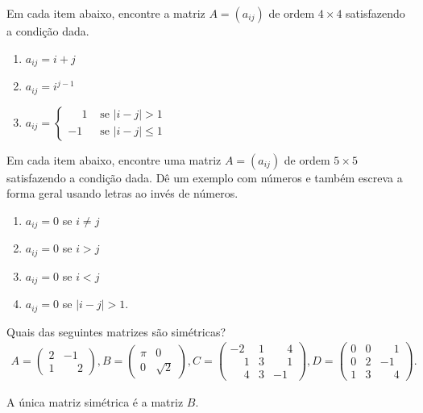 \documentclass[12pt]{exam}
\begin{document}
\begin{exercicio}
    Em cada item abaixo, encontre a matriz $A = (a_{ij})$ de ordem $4 \times 4$ satisfazendo a condição dada.
    \begin{enumerate}[label={\alph*})]
        \item $a_{ij} = i + j$
        \item $a_{ij} = i^{j - 1}$
        \item $a_{ij} = \begin{cases}\phantom{-} 1 & \mbox{ se } |i - j| > 1\\-1 & \mbox{ se } |i - j| \le 1\end{cases}$
    \end{enumerate}
\end{exercicio}

\begin{exercicio}
    Em cada item abaixo, encontre uma matriz $A = (a_{ij})$ de ordem $5 \times 5$ satisfazendo a condição dada. Dê um exemplo com números e também escreva a forma geral usando letras ao invés de números.
    \begin{enumerate}[label={\alph*})]
        \item $a_{ij} = 0$ se $i \ne j$
        \item $a_{ij} = 0$ se $i > j$
        \item $a_{ij} = 0$ se $i < j$
        \item $a_{ij} = 0$ se $|i - j| > 1$.
    \end{enumerate}
\end{exercicio}

\begin{exercicio}
    Quais das seguintes matrizes são simétricas?
    \begin{align*}
        A = \begin{pmatrix}2 & -1\\1 & \phantom{-} 2\end{pmatrix},
        B = \begin{pmatrix}\pi & 0\\0 & \sqrt{2}\end{pmatrix},
        C = \begin{pmatrix}-2 & 1 & \phantom{-} 4\\\phantom{-} 1 & 3 & \phantom{-} 1\\\phantom{-} 4 & 3 & -1\end{pmatrix},
        D = \begin{pmatrix}0 & 0 & \phantom{-} 1\\0 & 2 & -1\\1 & 3 & \phantom{-} 4\end{pmatrix}.
    \end{align*}
    \begin{solucao}
        A única matriz simétrica é a matriz $B$.
    \end{solucao}
\end{exercicio}
\end{document}
